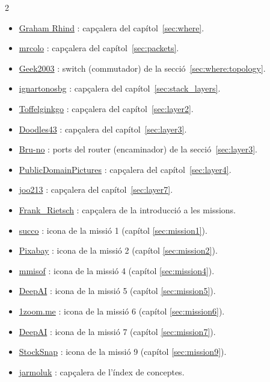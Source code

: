 \begin{multicols}{2}
\begin{itemize}
\item \href{https://www.pinterest.com/pin/118289927683058369/}{Graham Rhind} : capçalera del capítol~\ref{sec:where}.
\item \href{https://pixabay.com/photos/container-goods-ship-port-cargo-4675851/}{mrcolo} : capçalera del capítol~\ref{sec:packets}.
\item \href{https://commons.wikimedia.org/wiki/File:2550T-PWR-Front.jpg}{Geek2003} : switch (commutador) de la secció~\ref{sec:where:topology}.
\item \href{https://pixabay.com/photos/vegetable-onion-flavor-ingredient-6829271/}{ignartonosbg} : capçalera del capítol~\ref{sec:stack_layers}.
\item \href{https://commons.wikimedia.org/wiki/File:Winter_2004_DreamHack_LAN_Party.jpg}{Toffelginkgo} : capçalera del capítol~\ref{sec:layer2}.
\item \href{https://pixabay.com/photos/golden-gate-bridge-san-francisco-1549662/}{Doodles43} : capçalera del capítol~\ref{sec:layer3}.
\item \href{https://pixabay.com/photos/network-edp-plug-patch-cord-4393368/}{Bru-no} : ports del router (encaminador) de la secció~\ref{sec:layer3}.
\item \href{https://pixabay.com/photos/green-plastic-pipes-culvert-water-72772/}{PublicDomainPictures} : capçalera del capítol~\ref{sec:layer4}.
\item \href{https://pixabay.com/vectors/logo-icon-icon-collection-flat-1727647/}{joo213} : capçalera del capítol~\ref{sec:layer7}.
\item \href{https://pixabay.com/illustrations/ai-generated-mars-astronaut-9072070/}{Frank\_Rietsch} : capçalera de la introducció a les missions.
\item \href{https://pixabay.com/photos/abacus-calculate-mathematics-485704/}{succo} : icona de la missió 1 (capítol \ref{sec:mission1}).
\item \href{https://pixabay.com/photos/stairway-spiral-stairs-architecture-5551641/}{Pixabay} : icona de la missió 2 (capítol \ref{sec:mission2}).
\item \href{https://pixabay.com/photos/raisting-satellite-reception-signal-1010862/}{mmisof} : icona de la missió 4 (capítol \ref{sec:mission4}).
\item \href{https://deepai.org/machine-learning-model/text2img}{DeepAI} : icona de la missió 5 (capítol \ref{sec:mission5}).
\item \href{https://www.1zoom.me/en/wallpaper/588855/z3815.7/1080x1920}{1zoom.me} : icona de la missió 6 (capítol \ref{sec:mission6}).
\item \href{https://deepai.org/machine-learning-model/text2img}{DeepAI} : icona de la missió 7 (capítol \ref{sec:mission7}).
\item \href{https://pixabay.com/photos/architecture-building-infrastructure-2566798/}{StockSnap} : icona de la missió 9 (capítol \ref{sec:mission9}).
\item \href{https://pixabay.com/photos/list-surnames-table-personal-data-428312/}{jarmoluk} : capçalera de l'índex de conceptes.
\end{itemize}
\end{multicols}


